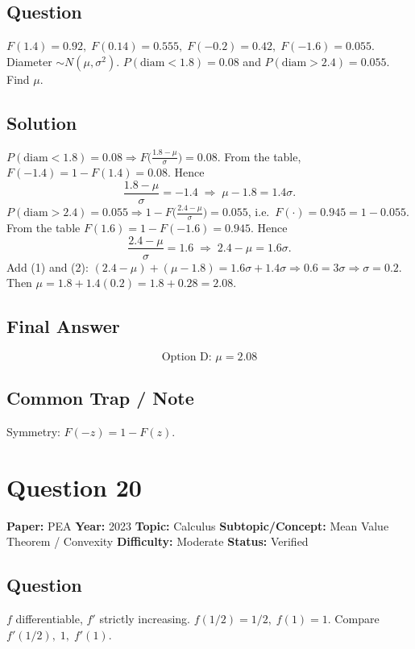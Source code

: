 \documentclass[11pt]{article}
\begin{document}
\subsection*{Question}
$F(1.4)=0.92,\;F(0.14)=0.555,\;F(-0.2)=0.42,\;F(-1.6)=0.055$. Diameter $\sim N(\mu,\sigma^2)$. $P(\text{diam}<1.8)=0.08$ and $P(\text{diam}>2.4)=0.055$. Find $\mu$.

\subsection*{Solution}
$P(\text{diam}<1.8)=0.08\Rightarrow F\bigl(\tfrac{1.8-\mu}{\sigma}\bigr)=0.08$. From the table, $F(-1.4)=1-F(1.4)=0.08$. Hence
\[
\frac{1.8-\mu}{\sigma}=-1.4 \;\Longrightarrow\; \mu-1.8=1.4\sigma.\tag{1}
\]
$P(\text{diam}>2.4)=0.055\Rightarrow 1-F\bigl(\tfrac{2.4-\mu}{\sigma}\bigr)=0.055$, i.e.\ $F(\cdot)=0.945=1-0.055$. From the table $F(1.6)=1-F(-1.6)=0.945$. Hence
\[
\frac{2.4-\mu}{\sigma}=1.6 \;\Longrightarrow\; 2.4-\mu=1.6\sigma.\tag{2}
\]
Add (1) and (2): $(2.4-\mu)+(\mu-1.8)=1.6\sigma+1.4\sigma\Rightarrow 0.6=3\sigma\Rightarrow \sigma=0.2$. Then $\mu=1.8+1.4(0.2)=1.8+0.28=2.08$.

\subsection*{Final Answer}
\[
\boxed{\text{Option D: } \mu=2.08}
\]

\subsection*{Common Trap / Note}
Symmetry: $F(-z)=1-F(z)$.

\medskip

\section*{Question 20}
\textbf{Paper:} PEA \quad \textbf{Year:} 2023 \quad \textbf{Topic:} Calculus \quad \textbf{Subtopic/Concept:} Mean Value Theorem / Convexity \quad \textbf{Difficulty:} Moderate \quad \textbf{Status:} Verified

\subsection*{Question}
$f$ differentiable, $f'$ strictly increasing. $f(1/2)=1/2,\;f(1)=1$. Compare $f'(1/2),\;1,\;f'(1)$.
\end{document}

